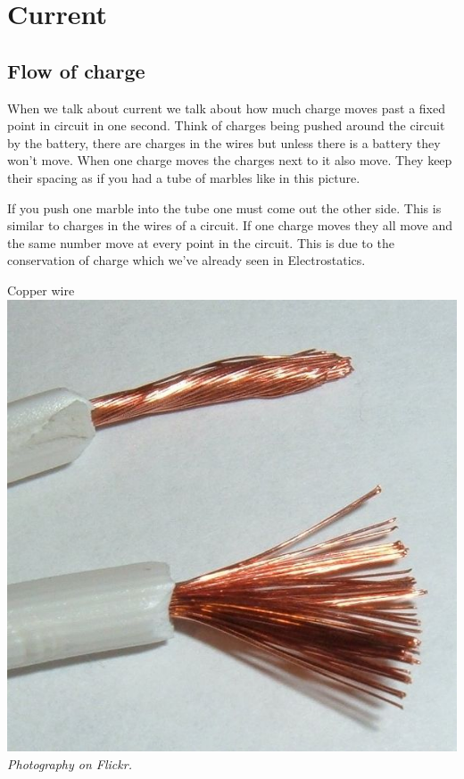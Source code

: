 \section{Current}

\subsection*{Flow of charge}

When we talk about current we talk about how much charge moves past a fixed point in circuit in one second. Think of charges being pushed around the circuit by the battery, there are charges in the wires but unless there is a battery they won't move. When one charge moves the charges next to it also move. They keep their spacing as if you had a tube of marbles like in this picture.
\begin{minipage}{.5\textwidth}

\begin{center}
\end{center}

If you push one marble into the tube one must come out the other side. This is similar to charges in the wires of a circuit.
If one charge moves they all move and the same number move at every point in the circuit. This is due to the conservation of charge which we've already seen in Electrostatics.
 \end{minipage}
\begin{minipage}{.5\textwidth}
\begin{center}
Copper wire\\
\includegraphics[width=.8\textwidth]{photos/copperwire.jpg}\\
\textit{Photography on Flickr.}
\end{center}  
\end{minipage}


